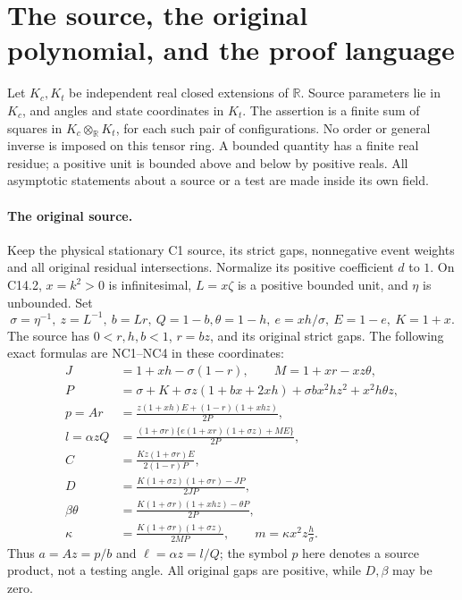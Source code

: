 \section{The source, the original polynomial, and the proof language}

Let $K_c,K_t$ be independent real closed extensions of $\mathbb R$.
Source parameters lie in $K_c$, and angles and state coordinates in
$K_t$. The assertion is a finite sum of squares in
$K_c\otimes_{\mathbb R}K_t$, for each such pair of configurations.
No order or general inverse is imposed on this tensor ring.
A bounded quantity has a finite real residue; a positive unit is
bounded above and below by positive reals. All asymptotic statements
about a source or a test are made inside its own field.

\paragraph{The original source.}
Keep the physical stationary C1 source, its strict gaps,
nonnegative event weights and all original residual intersections.
Normalize its positive coefficient $d$ to $1$. On C14.2,
$x=k^2>0$ is infinitesimal, $L=x\zeta$ is a positive bounded unit,
and $\eta$ is unbounded. Set
\[
 \sigma=\eta^{-1},\ z=L^{-1},\ b=Lr,\ Q=1-b,
 \theta=1-h,\ e=xh/\sigma,\ E=1-e,\ K=1+x.
\]
The source has $0<r,h,b<1$, $r=bz$, and its original strict gaps.
The following exact formulas are NC1--NC4 in these coordinates:
\[
\begin{split}
 J&=1+xh-\sigma(1-r),\qquad M=1+xr-xz\theta,\\
 P&=\sigma+K+\sigma z(1+bx+2xh)
                  +\sigma bx^2hz^2+x^2h\theta z,\\
 p=Ar&=\frac{z(1+xh)E+(1-r)(1+xhz)}{2P},\\
 l=\alpha zQ&=\frac{(1+\sigma r)
     \{e(1+xr)(1+\sigma z)+ME\}}{2P},\\
 C&=\frac{Kz(1+\sigma r)E}{2(1-r)P},\\
 D&=\frac{K(1+\sigma z)(1+\sigma r)-JP}{2JP},\\
 \beta\theta&=\frac{K(1+\sigma r)(1+xhz)-\theta P}{2P},\\
 \kappa&=\frac{K(1+\sigma r)(1+\sigma z)}{2MP},
 \qquad m=\kappa x^2z\frac h\sigma.
\end{split}                                                     \tag{P1}
\]
Thus $a=Az=p/b$ and $\ell=\alpha z=l/Q$; the symbol $p$ here
denotes a source product, not a testing angle. All original gaps
are positive, while $D,\beta$ may be zero.

